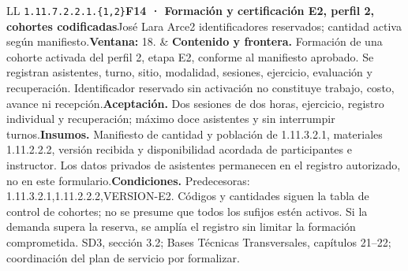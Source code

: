 \begin{longtable}{L{\tabcolsep\relax}L{\tabcolsep\relax}}
\texttt{1.\allowbreak{}11.\allowbreak{}7.\allowbreak{}2.\allowbreak{}2.\allowbreak{}1.\allowbreak{}\{1,\allowbreak{}2\}}\newline{}\textbf{F14 · Formación y certificación E2, perfil 2, cohortes codificadas}\newline{}José Lara Arce\newline{}2 identificadores reservados; cantidad activa según manifiesto.\newline{}\textbf{Ventana:} 18. & \textbf{Contenido y frontera.} Formación de una cohorte activada del perfil 2, etapa E2, conforme al manifiesto aprobado. Se registran asistentes, turno, sitio, modalidad, sesiones, ejercicio, evaluación y recuperación. Identificador reservado sin activación no constituye trabajo, costo, avance ni recepción.\newline{}\textbf{Aceptación.} Dos sesiones de dos horas, ejercicio, registro individual y recuperación; máximo doce asistentes y sin interrumpir turnos.\newline{}\textbf{Insumos.} Manifiesto de cantidad y población de 1.11.3.2.1, materiales 1.11.2.2.2, versión recibida y disponibilidad acordada de participantes e instructor. Los datos privados de asistentes permanecen en el registro autorizado, no en este formulario.\newline{}\textbf{Condiciones.} Predecesoras: 1.11.3.2.1,1.11.2.2.2,VERSION-E2. Códigos y cantidades siguen la tabla de control de cohortes; no se presume que todos los sufijos estén activos. Si la demanda supera la reserva, se amplía el registro sin limitar la formación comprometida. SD3, sección 3.2; Bases Técnicas Transversales, capítulos 21--22; coordinación del plan de servicio por formalizar.\\\hline

\end{longtable}
